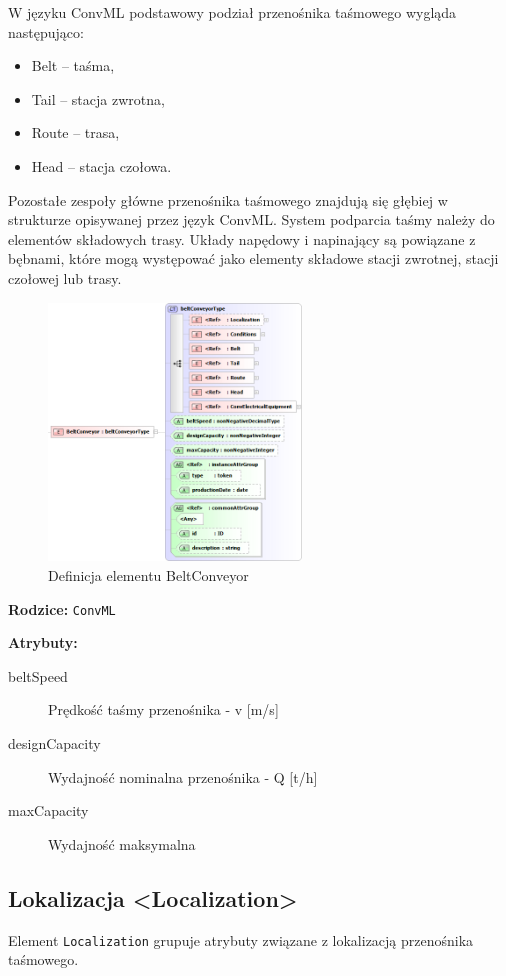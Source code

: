 \documentclass[12pt,a4paper]{article}
\begin{document}
W języku ConvML podstawowy podział przenośnika taśmowego wygląda następująco:

\begin{itemize}
\item Belt -- taśma,
\item Tail -- stacja zwrotna,
\item Route -- trasa,
\item Head -- stacja czołowa.
\end{itemize}

Pozostałe zespoły główne przenośnika taśmowego znajdują się głębiej w strukturze
opisywanej przez język ConvML.  System podparcia taśmy należy do elementów
składowych trasy.  Układy napędowy i napinający są powiązane z bębnami, które
mogą występować jako elementy składowe stacji zwrotnej, stacji czołowej lub
trasy.

\begin{figure}[H]
  \centering
  \includegraphics[width=0.6\textwidth]{png/liquid/BeltConveyor}
  \caption{Definicja elementu BeltConveyor}
  \label{fig:beltConveyor-xsd}
\end{figure}

\noindent\textbf{Rodzice:} \texttt{ConvML}

\noindent\textbf{Atrybuty:}
\begin{description}
\item[beltSpeed] Prędkość taśmy przenośnika - v [m/s]
\item[designCapacity] Wydajność nominalna przenośnika - Q [t/h]
\item[maxCapacity] Wydajność maksymalna
\end{description}


\subsection{Lokalizacja <Localization>}
Element {\tt Localization} grupuje atrybuty związane z lokalizacją przenośnika
taśmowego.
\end{document}
